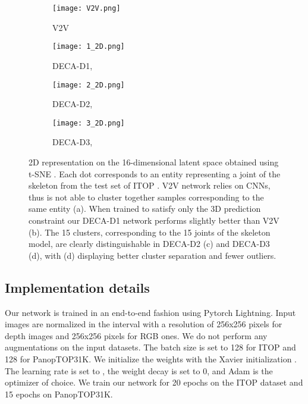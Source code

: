 \documentclass[10pt,twocolumn,letterpaper]{article}
\begin{document}
\begin{figure*}[]
        \begin{subfigure}[b]{0.25\textwidth}
                \texttt{[image: V2V.png]}
                \caption{V2V \cite{moon2018v2v}}
                \label{fig:latentV2V}
        \end{subfigure}\begin{subfigure}[b]{0.25\textwidth}
                \texttt{[image: 1\_2D.png]}
                \caption{DECA-D1, }
                \label{fig:latent3D}
        \end{subfigure}\begin{subfigure}[b]{0.25\textwidth}
                \texttt{[image: 2\_2D.png]}
                \caption{DECA-D2, }
                \label{fig:latent3D+W}
        \end{subfigure}\begin{subfigure}[b]{0.25\textwidth}
                \texttt{[image: 3\_2D.png]}
                \caption{DECA-D3, }
                \label{fig:latent3D+2D+W}
        \end{subfigure}\caption{2D representation on the 16-dimensional latent space obtained using t-SNE \cite{van2008visualizing}. Each dot corresponds to an entity  representing a joint  of the skeleton from the test set of ITOP \cite{haque2016towards}. V2V network \cite{moon2018v2v} relies on CNNs, thus is not able to cluster together samples corresponding to the same entity (a). When trained to satisfy only the 3D prediction constraint our DECA-D1 network performs slightly better than V2V (b). The 15 clusters, corresponding to the 15 joints of the skeleton model, are clearly distinguishable in DECA-D2 (c) and DECA-D3 (d), with (d) displaying better cluster separation and fewer outliers.}\label{fig:latent2D}
\end{figure*}

\subsection{Implementation details}

Our network is trained in an end-to-end fashion using Pytorch Lightning. Input images are normalized in the interval  with a resolution of 256x256 pixels for depth images and 256x256 pixels for RGB ones. We do not perform any augmentations on the input datasets. The batch size is set to 128 for ITOP and 128 for PanopTOP31K. We initialize the weights with the Xavier initialization \cite{glorot2010understanding}. The learning rate is set to , the weight decay is set to 0, and Adam is the optimizer of choice. We train our network for 20 epochs on the ITOP dataset and 15 epochs on PanopTOP31K.
\end{document}
